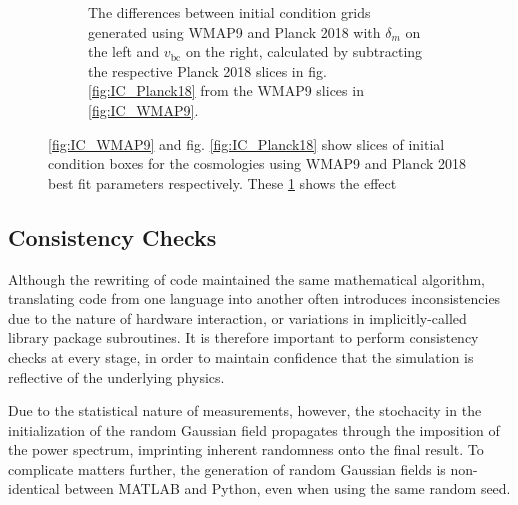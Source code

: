 \documentclass[floats,floatfix,showpacs,amssymb,prd,superscriptaddress,nofootinbib]{revtex4-2} %
\newcommand{\red}{\textcolor{red}}
\begin{document}
\begin{figure}[H]
\begin{subfigure}[b]{0.9\textwidth}
         \caption{The differences between initial condition grids generated using WMAP9 and Planck 2018 with $\delta_m$ on the left and $v_{\text{bc}}$ on the right, calculated by subtracting the respective Planck 2018 slices in fig. \ref{fig:IC_Planck18} from the WMAP9 slices in \ref{fig:IC_WMAP9}.}
         \label{fig:IC_difference_WMAP9_Planck18}
     \end{subfigure}
        \caption{\ref{fig:IC_WMAP9} and fig. \ref{fig:IC_Planck18} show slices of initial condition boxes for the cosmologies using WMAP9 and Planck 2018 best fit parameters respectively. These \ref{fig:IC_difference_WMAP9_Planck18} shows the effect}
        \label{fig:IC_WMAP9_Planck18}
\end{figure}

\newpage
\subsection{Consistency Checks}
Although the rewriting of code maintained the same mathematical algorithm, translating code from one language into another often introduces inconsistencies due to the nature of hardware interaction, or variations in implicitly-called library package subroutines. It is therefore important to perform consistency checks at every stage, in order to maintain confidence that the simulation is reflective of the underlying physics.

Due to the statistical nature of measurements, however, the stochacity in the initialization of the random Gaussian field propagates through the imposition of the power spectrum, imprinting inherent randomness onto the final result. To complicate matters further, the generation of random Gaussian fields is non-identical between MATLAB and Python, even when using the same random seed. 
\end{document}
